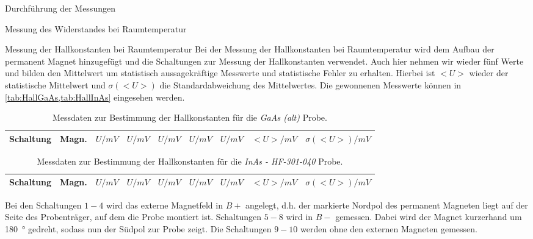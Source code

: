\documentclass[pdftex, a4paper,11pt, twoside, ngerman]{report}
\begin{document}
\begin{chapter}{Durchführung der Messungen}
\begin{section}{Messung des Widerstandes bei Raumtemperatur}
    \end{section}
    
    
    
    \begin{section}{Messung der Hallkonstanten bei Raumtemperatur}
      \label{chp:MessungHallkonstanteRaumtemperatur}
      Bei der Messung der Hallkonstanten bei Raumtemperatur wird dem Aufbau der
      permanent Magnet hinzugefügt und die Schaltungen zur Messung der
      Hallkonstanten verwendet.
      Auch hier nehmen wir wieder fünf Werte und bilden den Mittelwert um
      statistisch aussagekräftige Messwerte und statistische Fehler zu erhalten.
      Hierbei ist $<U>$ wieder der statistische Mittelwert und $\sigma(<U>)$ die
      Standardabweichung des Mittelwertes.
      Die gewonnenen Messwerte können in
      \cref{tab:HallGaAs,tab:HallInAs} eingesehen werden.
      \begin{table}[htbp]
        \centering
        \footnotesize
        \begin{tabular}{ccccccccc}
          Schaltung & Magn. & $U / mV$ & $U / mV$  & $U / mV$  & $U / mV$  & $U / mV$
               & $<U> / mV$  & $\sigma(<U>) / mV$ \\ \hline \hline
          
        \end{tabular}
        \caption{Messdaten zur Bestimmung der Hallkonstanten für die
            \textit{GaAs (alt)} Probe.}
        \label{tab:HallGaAs}
      \end{table}
      \begin{table}[htbp]
        \centering
        \footnotesize
        \begin{tabular}{ccccccccc}
          Schaltung & Magn. & $U / mV$ & $U / mV$  & $U / mV$  & $U / mV$  & $U / mV$
               & $<U> / mV$  & $\sigma(<U>) / mV$ \\ \hline \hline
          
        \end{tabular}
        \caption{Messdaten zur Bestimmung der Hallkonstanten für die
            \textit{InAs - HF-301-040} Probe.}
        \label{tab:HallInAs}
      \end{table}
      
      Bei den Schaltungen $1-4$ wird das externe Magnetfeld in \textit{$B+$}
      angelegt, d.h. der markierte Nordpol des permanent Magneten liegt auf
      der Seite des Probenträger, auf dem die Probe montiert ist.
      Schaltungen $5-8$ wird in \textit{$B-$} gemessen. Dabei wird der Magnet
      kurzerhand um \SI{180}{\degree} gedreht, sodass nun der Südpol zur Probe
      zeigt.
      Die Schaltungen $9-10$ werden ohne den externen Magneten gemessen.
      

\end{section}
\end{chapter}
\end{document}
